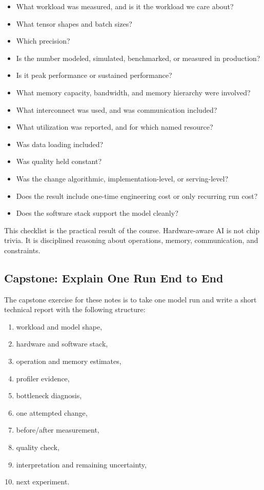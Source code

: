 \begin{itemize}[leftmargin=*]
  \item What workload was measured, and is it the workload we care about?
  \item What tensor shapes and batch sizes?
  \item Which precision?
  \item Is the number modeled, simulated, benchmarked, or measured in production?
  \item Is it peak performance or sustained performance?
  \item What memory capacity, bandwidth, and memory hierarchy were involved?
  \item What interconnect was used, and was communication included?
  \item What utilization was reported, and for which named resource?
  \item Was data loading included?
  \item Was quality held constant?
  \item Was the change algorithmic, implementation-level, or serving-level?
  \item Does the result include one-time engineering cost or only recurring run cost?
  \item Does the software stack support the model cleanly?
\end{itemize}

This checklist is the practical result of the course. Hardware-aware AI is not chip trivia. It is disciplined reasoning about operations, memory, communication, and constraints.

\subsection{Capstone: Explain One Run End to End}

The capstone exercise for these notes is to take one model run and write a short technical report with the following structure:
\begin{enumerate}[leftmargin=*]
  \item workload and model shape,
  \item hardware and software stack,
  \item operation and memory estimates,
  \item profiler evidence,
  \item bottleneck diagnosis,
  \item one attempted change,
  \item before/after measurement,
  \item quality check,
  \item interpretation and remaining uncertainty,
  \item next experiment.
\end{enumerate}

